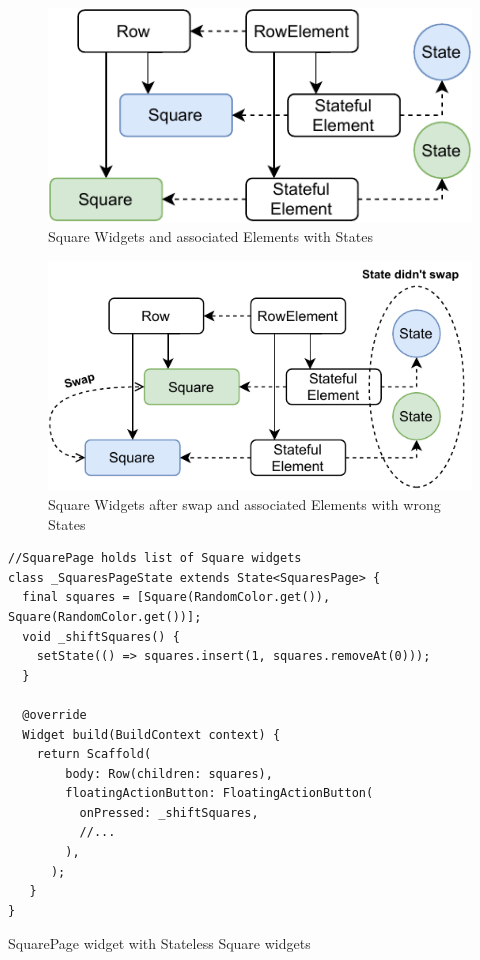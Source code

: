 \begin{figure}[ht]
    \centering
    \includegraphics[width=0.75\linewidth]{img/flutter/key_stateful_start.pdf}
    \caption{Square Widgets and associated Elements with States}
    \label{fig:keys_start}
\end{figure}

\begin{figure}[ht]
    \centering
    \includegraphics[width=0.75\linewidth]{img/flutter/key_stateful_wrong_state.pdf}
    \caption{Square Widgets after swap and associated Elements with wrong States}
    \label{fig:keys_wrong}
\end{figure}

\begin{listing}[ht]
\begin{verbatim}
//SquarePage holds list of Square widgets
class _SquaresPageState extends State<SquaresPage> {
  final squares = [Square(RandomColor.get()), Square(RandomColor.get())];
  void _shiftSquares() {
    setState(() => squares.insert(1, squares.removeAt(0)));
  }

  @override
  Widget build(BuildContext context) {
    return Scaffold(
        body: Row(children: squares),
        floatingActionButton: FloatingActionButton(
          onPressed: _shiftSquares,
          //...
        ),
      );
   }
}
\end{verbatim}
\caption{SquarePage widget with Stateless Square widgets}
\label{listing:keys_page_stateless}
\end{listing}

